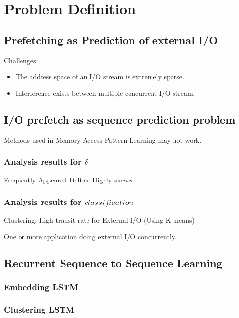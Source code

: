\section{Problem Definition}

\subsection{Prefetching as Prediction of external I/O} Challenges:

\begin{itemize}
\item The address space of an I/O stream is extremely sparse.
\item Interference exists between multiple concurrent I/O stream.
\end{itemize}

\subsection{I/O prefetch as sequence prediction problem}

Methods used in Memory Access Pattern Learning may not work.

\subsubsection{Analysis results for $\delta$}

Frequently Appeared Deltas: Highly skewed

\subsubsection{Analysis results for $classification$}

Clustering: High transit rate for External I/O (Using K-means)

One or more application doing external I/O concurrently.

\subsection{Recurrent Sequence to Sequence Learning}

\subsubsection{Embedding LSTM}

\subsubsection{Clustering LSTM}

